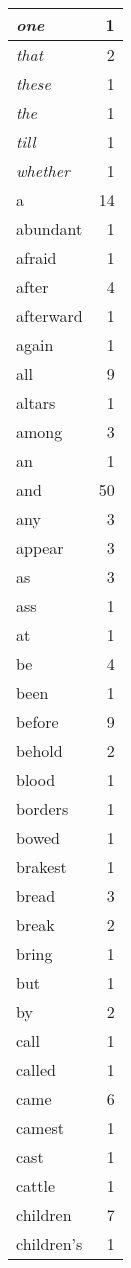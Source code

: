 \begin{center}
\begin{longtable}{l|r}
\emph{one} & 1 \\ \hline
\emph{that} & 2 \\ \hline
\emph{these} & 1 \\ \hline
\emph{the} & 1 \\ \hline
\emph{till} & 1 \\ \hline
\emph{whether} & 1 \\ \hline
a & 14 \\ \hline
abundant & 1 \\ \hline
afraid & 1 \\ \hline
after & 4 \\ \hline
afterward & 1 \\ \hline
again & 1 \\ \hline
all & 9 \\ \hline
altars & 1 \\ \hline
among & 3 \\ \hline
an & 1 \\ \hline
and & 50 \\ \hline
any & 3 \\ \hline
appear & 3 \\ \hline
as & 3 \\ \hline
ass & 1 \\ \hline
at & 1 \\ \hline
be & 4 \\ \hline
been & 1 \\ \hline
before & 9 \\ \hline
behold & 2 \\ \hline
blood & 1 \\ \hline
borders & 1 \\ \hline
bowed & 1 \\ \hline
brakest & 1 \\ \hline
bread & 3 \\ \hline
break & 2 \\ \hline
bring & 1 \\ \hline
but & 1 \\ \hline
by & 2 \\ \hline
call & 1 \\ \hline
called & 1 \\ \hline
came & 6 \\ \hline
camest & 1 \\ \hline
cast & 1 \\ \hline
cattle & 1 \\ \hline
children & 7 \\ \hline
children's & 1 \\ \hline

\end{longtable}
\end{center}
